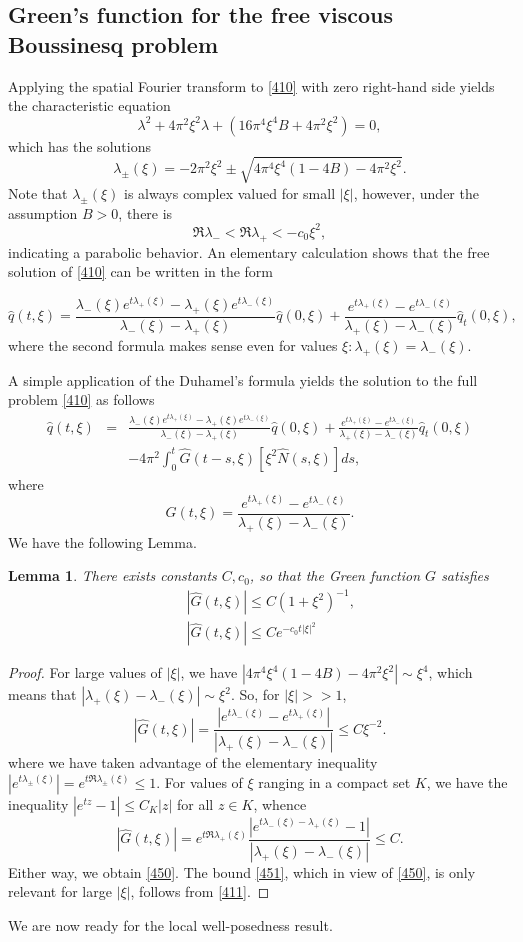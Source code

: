 \documentclass[12pt]{amsart}
\newtheorem{lemma}{Lemma}
\theoremstyle{definition}
\theoremstyle{remark}
\numberwithin{equation}{section}
\renewcommand{\(}{\left(}
\renewcommand{\)}{\right)}
\renewcommand{\[}{\left[}
\renewcommand{\]}{\right]}
\newcommand{\f}[2]{\frac{#1}{#2}}
\newcommand{\la}{\lambda}
\begin{document}
\subsection{Green's function for the free viscous Boussinesq problem}
Applying the spatial Fourier transform to \eqref{410}  with zero right-hand side yields the characteristic equation 
$$
\la^2 + 4\pi^2 \xi^2 \la +(16 \pi^4 \xi^4 B +4\pi^2 \xi^2)=0,
$$
which has the solutions 
$$
\la_\pm(\xi) =-2\pi^2\xi^2 \pm \sqrt{4\pi^4\xi^4(1-4 B)-4\pi^2\xi^2}.
$$
Note that $\la_\pm(\xi)$ is always complex valued for small $|\xi|$, however, under the assumption $B>0$, there is
\begin{equation}
	\label{411} 
	\Re\la_-<\Re\la_+<-c_0 \xi^2, 
\end{equation}
indicating a parabolic behavior. An elementary calculation shows that the free solution of \eqref{410} can be written in the form 

$$
	\hat{q}(t, \xi)=\f{\la_-(\xi) e^{t \la_+(\xi)}-\la_+(\xi) e^{t \la_-(\xi)}}{\la_-(\xi)-\la_+(\xi)} \hat{q}(0,\xi) + \f{e^{t \la_+(\xi)}-e^{t \la_-(\xi)}}{\la_+(\xi)-\la_-(\xi)} \hat{q}_t(0,\xi),
$$
where the second formula makes sense even for values $\xi: \la_+(\xi)=\la_-(\xi)$. 

A simple application of the Duhamel's formula yields the solution to the full problem \eqref{410} as follows 
\begin{eqnarray}
	\label{420} 
		\hat{q}(t, \xi) &=& \f{\la_-(\xi) e^{t \la_+(\xi)}-\la_+(\xi) e^{t \la_-(\xi)}}{\la_-(\xi)-\la_+(\xi)} \hat{q}(0,\xi) + \f{e^{t \la_+(\xi)}-e^{t \la_-(\xi)}}{\la_+(\xi)-\la_-(\xi)} \hat{q}_t(0,\xi) \\
		\nonumber
		& & -4\pi^2 \int_0^t \hat{G}(t-s, \xi) [\xi^2 \hat{N}(s, \xi)] ds,
\end{eqnarray}
where 
$$
\hat{G}(t,  \xi) =  \f{e^{t\la_+(\xi)}-e^{t\la_-(\xi)}}{\la_+(\xi)-\la_-(\xi)}. 
$$
We have the following Lemma.
\begin{lemma}
	\label{le:40} 
	There exists constants $C, c_0$, so that the  Green function $G$ satisfies 
	\begin{eqnarray}
		\label{450} 
	& & 	|\hat{G}(t, \xi)|\leq C(1+\xi^2)^{-1}, 	\\
		\label{451} 
	& & 	|\hat{G}(t, \xi)|\leq 
		C e^{-c_0 t |\xi|^2}
	\end{eqnarray}
\end{lemma}
\begin{proof}
	For large values of $|\xi|$, we have  $|4\pi^4\xi^4(1-4 B)-4\pi^2\xi^2|\sim \xi^4$, which means that $|\la_+(\xi)-\la_-(\xi)|\sim \xi^2$. So, for $|\xi|>>1$, 
	$$
	|\hat{G}(t, \xi)|=\f{|e^{t \la_-(\xi)}-e^{t  \la_+(\xi)}|}{|\la_+(\xi)-\la_-(\xi)|}\leq C\xi^{-2}.
	$$
where we have taken advantage of  the elementary inequality 
$|e^{t \la_\pm(\xi)}|=e^{t \Re \la_\pm(\xi)}\leq 1$. For values of $\xi$ ranging in a compact set $K$,  we have the inequality $|e^{t z}-1|\leq C_K|z|$ for all $z\in K$, whence 
	$$
|\hat{G}(t, \xi)|=e^{ t \Re \la_+(\xi)}\f{|e^{t  \la_-(\xi)-\la_+(\xi)}-1|}{|\la_+(\xi)-\la_-(\xi)|}\leq C.
$$
Either way, we obtain \eqref{450}. The bound \eqref{451}, which in view of \eqref{450}, is only relevant for large $|\xi|$, follows from \eqref{411}. 
\end{proof}
We are now ready for the local well-posedness result. 
\end{document}
